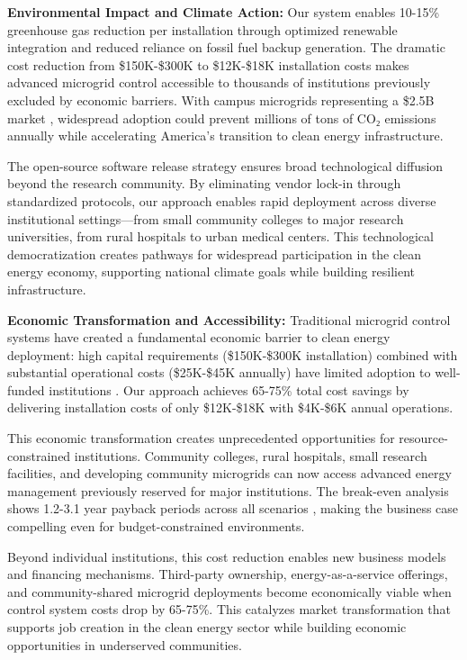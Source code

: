 \textbf{Environmental Impact and Climate Action:} Our system enables 10-15\% greenhouse gas reduction per installation through optimized renewable integration and reduced reliance on fossil fuel backup generation. The dramatic cost reduction from \$150K-\$300K to \$12K-\$18K installation costs \cite{our2024economic} makes advanced microgrid control accessible to thousands of institutions previously excluded by economic barriers. With campus microgrids representing a \$2.5B market \cite{our2024economic}, widespread adoption could prevent millions of tons of CO₂ emissions annually while accelerating America's transition to clean energy infrastructure.

The open-source software release strategy ensures broad technological diffusion beyond the research community. By eliminating vendor lock-in through standardized protocols, our approach enables rapid deployment across diverse institutional settings—from small community colleges to major research universities, from rural hospitals to urban medical centers. This technological democratization creates pathways for widespread participation in the clean energy economy, supporting national climate goals while building resilient infrastructure.

\textbf{Economic Transformation and Accessibility:} Traditional microgrid control systems have created a fundamental economic barrier to clean energy deployment: high capital requirements (\$150K-\$300K installation) combined with substantial operational costs (\$25K-\$45K annually) have limited adoption to well-funded institutions \cite{hirsch2018,sigrin2019}. Our approach achieves 65-75\% total cost savings \cite{our2024economic} by delivering installation costs of only \$12K-\$18K with \$4K-\$6K annual operations.

This economic transformation creates unprecedented opportunities for resource-constrained institutions. Community colleges, rural hospitals, small research facilities, and developing community microgrids can now access advanced energy management previously reserved for major institutions. The break-even analysis shows 1.2-3.1 year payback periods across all scenarios \cite{our2024economic}, making the business case compelling even for budget-constrained environments.

Beyond individual institutions, this cost reduction enables new business models and financing mechanisms. Third-party ownership, energy-as-a-service offerings, and community-shared microgrid deployments become economically viable when control system costs drop by 65-75\%. This catalyzes market transformation that supports job creation in the clean energy sector while building economic opportunities in underserved communities.


